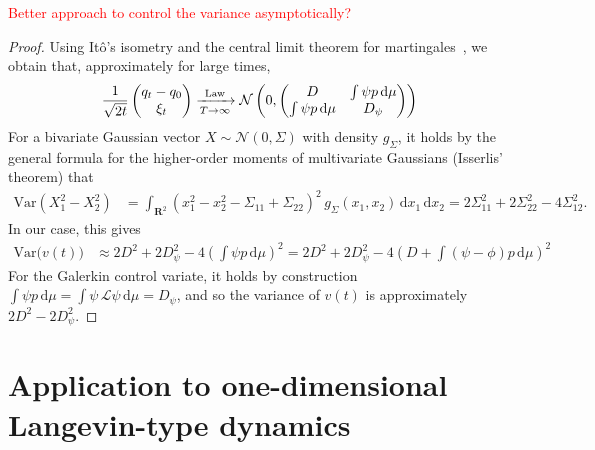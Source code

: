 \documentclass[11pt,a4paper]{article}
\newcommand{\real}{\mathbf R}
\renewcommand{\d}{\mathrm d}
\theoremstyle{plain}
\numberwithin{equation}{section}
\renewcommand{\leq}{\leqslant}
\begin{document}
\textcolor{red}{Better approach to control the variance asymptotically?}
\begin{proof}
    Using It\^o's isometry and the central limit theorem for martingales~\cite[Theorem 3.3]{pavliotis2008multiscale},
    we obtain that, approximately for large times,
    \[
        \frac{1}{\sqrt{2t}}
        \begin{pmatrix}
            q_t - q_0 \\
            \xi_t
        \end{pmatrix}
        \xrightarrow[T \to \infty]{\rm Law}
        \mathcal N \left(0,
            \begin{pmatrix}
                D & \int \psi p \, \d \mu \\
                \int \psi p \, \d \mu & D_{\psi} \\
            \end{pmatrix}
        \right)
    \]
    For a bivariate Gaussian vector $X \sim \mathcal N(0, \Sigma)$ with density $g_{\Sigma}$,
    it holds by the general formula for the higher-order moments of multivariate Gaussians (Isserlis' theorem)
    that
    \begin{align*}
        \mathrm{Var} (X_1^2 - X_2^2)
        &= \int_{\real^2} \left( x_1^2 - x_2^2 - \Sigma_{11} + \Sigma_{22} \right)^2 \, g_{\Sigma}(x_1, x_2) \, \d x_1 \, \d x_2
        = 2 \Sigma_{11}^2 + 2 \Sigma_{22}^2 - 4 \Sigma_{12}^2.
    \end{align*}
    In our case, this gives
    \begin{align*}
        \mathrm{Var}\bigl(v(t)\bigr)
        &\approx 2 D^2 + 2 D_{\psi}^2 - 4 \left( \int \psi p \, \d \mu \right)^2
        = 2 D^2 + 2 D_{\psi}^2 - 4 \left( D + \int (\psi - \phi) p \, \d \mu \right)^2
    \end{align*}
    For the Galerkin control variate, it holds by construction $\int \psi p \, \d \mu = \int \psi \, \mathcal L \psi \, \d \mu = D_{\psi}$,
    and so the variance of $v(t)$ is approximately $2 D^2 - 2 D_{\psi}^2$.
\end{proof}

\section{Application to one-dimensional Langevin-type dynamics}%
\label{sec:application_to_one_dimensional_langevin_type_dynamics}
\end{document}
